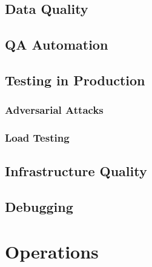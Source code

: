 \documentclass[12pt, a4paper]{report}
\begin{document}
\section{Data Quality}

\lipsum[23][1-4]

\section{QA Automation}

\lipsum[24][1-4]

\section{Testing in Production}

\lipsum[25][1-3]

\subsection*{Adversarial Attacks}

\lipsum[26][1-3]

\subsection*{Load Testing}

\lipsum[27][1-3]

\section{Infrastructure Quality}

\lipsum[28][1-4]

\section{Debugging}

\lipsum[29][1-4]

\chapter{Operations}
\end{document}
